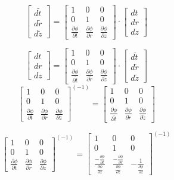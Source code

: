 \documentclass[12pt, a4paper]{article}
\begin{document}
$$
\begin{bmatrix}
  d \widetilde{t} \\
  d \widetilde{r} \\
  d \widetilde{z}
\end{bmatrix}
=
\begin{bmatrix}
  1 & 0 & 0 \\
  0 & 1 & 0 \\
  \frac{\partial \phi}{\partial t} & \frac{\partial \phi}{\partial r} & \frac{\partial \phi}{\partial z}
\end{bmatrix}
\cdot
\begin{bmatrix}
    dt \\
    dr \\
    dz
\end{bmatrix}
$$

$$
\begin{bmatrix}
  d t \\
  d r \\
  d z
\end{bmatrix}
=
\begin{bmatrix}
  1 & 0 & 0 \\
  0 & 1 & 0 \\
  \frac{\partial \phi}{\partial \widetilde{t}} & \frac{\partial \phi}{\partial \widetilde{r}} & \frac{\partial \phi}{\partial \widetilde{z}}
\end{bmatrix}
\cdot
\begin{bmatrix}
    d\widetilde{t} \\
    d\widetilde{r} \\
    d\widetilde{z}
\end{bmatrix}
$$
$$
\begin{bmatrix}
  1 & 0 & 0 \\
  0 & 1 & 0 \\
  \frac{\partial \phi}{\partial t} & \frac{\partial \phi}{\partial r} & \frac{\partial \phi}{\partial z}
\end{bmatrix}^(-1)
=
\begin{bmatrix}
  1 & 0 & 0 \\
  0 & 1 & 0 \\
  \frac{\partial \phi}{\partial \widetilde{t}} & \frac{\partial \phi}{\partial \widetilde{r}} & \frac{\partial \phi}{\partial \widetilde{z}}
\end{bmatrix}
$$

$$
\begin{bmatrix}
  1 & 0 & 0 \\
  0 & 1 & 0 \\
  \frac{\partial \phi}{\partial t} & \frac{\partial \phi}{\partial r} & \frac{\partial \phi}{\partial z}
\end{bmatrix}^(-1)
=
\begin{bmatrix}
  1 & 0 & 0 \\
  0 & 1 & 0 \\
  \frac{-\frac{\partial \phi}{\partial t}}{\frac{\partial \phi}{\partial z}} & \frac{-\frac{\partial \phi}{\partial r}}{\frac{\partial \phi}{\partial z}} & -\frac{1}{\frac{\partial \phi}{\partial z}}
\end{bmatrix}^(-1)
$$
\end{document}
